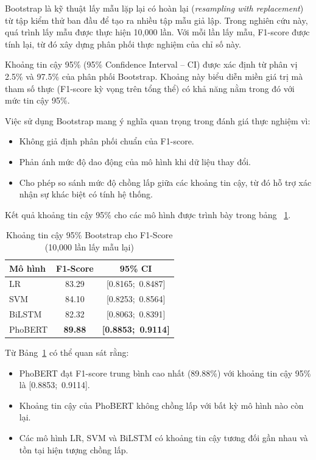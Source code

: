 \documentclass[12pt, a4paper]{report}
\newcommand{\phobertFone}{89.88}
\newcommand{\lrFone}{83.29}
\newcommand{\svmFone}{84.10}
\newcommand{\bilstmFone}{82.32}
\newcommand{\lrFoneCI}{[0.8165;\ 0.8487]}
\newcommand{\svmFoneCI}{[0.8253;\ 0.8564]}
\newcommand{\bilstmFoneCI}{[0.8063;\ 0.8391]}
\newcommand{\phobertFoneCI}{[0.8853;\ 0.9114]}
\begin{document}
Bootstrap là kỹ thuật lấy mẫu lặp lại có hoàn lại 
(\textit{resampling with replacement}) từ tập kiểm thử ban đầu 
để tạo ra nhiều tập mẫu giả lập. Trong nghiên cứu này, quá trình 
lấy mẫu được thực hiện 10,000 lần. Với mỗi lần lấy mẫu, 
F1-score được tính lại, từ đó xây dựng phân phối thực nghiệm 
của chỉ số này.

Khoảng tin cậy 95\% (95\% Confidence Interval -- CI) được xác định 
từ phân vị 2.5\% và 97.5\% của phân phối Bootstrap. 
Khoảng này biểu diễn miền giá trị mà tham số thực 
(F1-score kỳ vọng trên tổng thể) có khả năng nằm trong đó 
với mức tin cậy 95\%.

Việc sử dụng Bootstrap mang ý nghĩa quan trọng trong đánh giá 
thực nghiệm vì:

\begin{itemize}
    \item Không giả định phân phối chuẩn của F1-score.
    \item Phản ánh mức độ dao động của mô hình khi dữ liệu thay đổi.
    \item Cho phép so sánh mức độ chồng lấp giữa các khoảng tin cậy, 
    từ đó hỗ trợ xác nhận sự khác biệt có tính hệ thống.
\end{itemize}

Kết quả khoảng tin cậy 95\% cho các mô hình được trình bày 
trong bảng ~\ref{tab:ci}.

\begin{table}[H]
\centering
\caption{Khoảng tin cậy 95\% Bootstrap cho F1-Score (10,000 lần lấy mẫu lại)}
\label{tab:ci}
\begin{tabular}{lcc}
\toprule
\textbf{Mô hình} & \textbf{F1-Score} & \textbf{95\% CI} \\
\midrule
LR      & \lrFone  & \lrFoneCI{} \\
SVM     & \svmFone & \svmFoneCI{} \\
BiLSTM  & \bilstmFone & \bilstmFoneCI{} \\
PhoBERT & \textbf{\phobertFone} & \textbf{\phobertFoneCI{}} \\
\bottomrule
\end{tabular}
\end{table}

Từ Bảng~\ref{tab:ci} có thể quan sát rằng:

\begin{itemize}
    \item PhoBERT đạt F1-score trung bình cao nhất (\phobertFone  \%)
    với khoảng tin cậy 95\% là {\phobertFoneCI{}}.
    
    \item Khoảng tin cậy của PhoBERT không chồng lấp với bất kỳ 
    mô hình nào còn lại.
    
    \item Các mô hình LR, SVM và BiLSTM có khoảng tin cậy tương đối 
    gần nhau và tồn tại hiện tượng chồng lấp.
\end{itemize}
\end{document}
